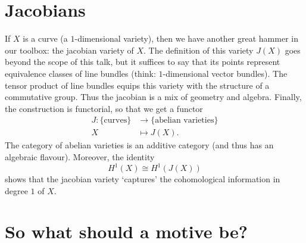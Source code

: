 \documentclass[a4paper,10pt]{article}
\begin{document}
\section{Jacobians}

If $X$ is a curve (a $1$-dimensional variety), then we have another great
hammer in our toolbox: the jacobian variety of $X$. The definition of this
variety $J(X)$ goes beyond the scope of this talk, but it suffices to say that
its points represent equivalence classes of line bundles (think:
$1$-dimensional vector bundles). The tensor product of line bundles equips this
variety with the structure of a commutative group. Thus the jacobian is a mix
of geometry and algebra. Finally, the construction is functorial, so that we
get a functor
\begin{align*} %
	J \colon \{\text{curves}\} &\to \{\text{abelian varieties}\} \\
	X &\mapsto J(X).
\end{align*} %
The category of abelian varieties is an additive category (and thus has an
algebraic flavour). Moreover, the identity
\[
	H^{1}(X) \cong H^{1}(J(X))
\]
shows that the jacobian variety `captures' the cohomological information in
degree $1$ of $X$.

\section{So what should a motive be?}
\end{document}
